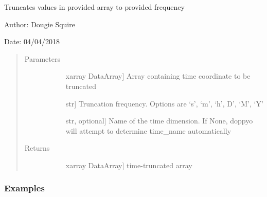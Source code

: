\documentclass[letterpaper,10pt,english]{sphinxmanual}
\begin{document}
\begin{fulllineitems}
\label{\detokenize{utils_doc:utils.trunc_time}}
Truncates values in provided array to provided frequency

\begin{DUlineblock}{0em}
\item[] Author: Dougie Squire
\item[] Date: 04/04/2018
\end{DUlineblock}
\begin{quote}\begin{description}
\item[{Parameters}] \leavevmode\begin{description}
\item[{}] \leavevmode{[}xarray DataArray{]}
Array containing time coordinate to be truncated

\item[{}] \leavevmode{[}str{]}
Truncation frequency. Options are ‘s’, ‘m’, ‘h’, D’, ‘M’, ‘Y’

\item[{}] \leavevmode{[}str, optional{]}
Name of the time dimension. If None, doppyo will attempt to determine time\_name                     automatically

\end{description}

\item[{Returns}] \leavevmode\begin{description}
\item[{}] \leavevmode{[}xarray DataArray{]}
time-truncated array

\end{description}

\end{description}\end{quote}
\subsubsection*{Examples}


\end{fulllineitems}
\end{document}
